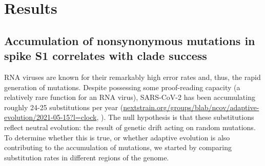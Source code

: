 \documentclass[11pt,oneside,letterpaper]{article}
\begin{document}
\section*{Results}
\subsection*{Accumulation of nonsynonymous mutations in spike S1 correlates with clade success}
RNA viruses are known for their remarkably high error rates and, thus, the rapid generation of mutations.
Despite possessing some proof-reading capacity (a relatively rare function for an RNA virus), SARS-CoV-2 has been accumulating roughly 24-25 substitutions per year (\href{https://nextstrain.org/groups/blab/ncov/adaptive-evolution/2021-05-15?l=clock}{nextstrain.org/groups/blab/ncov/adaptive-evolution/2021-05-15?l=clock}, \cite{Hadfield2018-wr}).
The null hypothesis is that these substitutions reflect neutral evolution: the result of genetic drift acting on random mutations.
To determine whether this is true, or whether adaptive evolution is also contributing to the accumulation of mutations, we started by comparing substitution rates in different regions of the genome.
\end{document}
